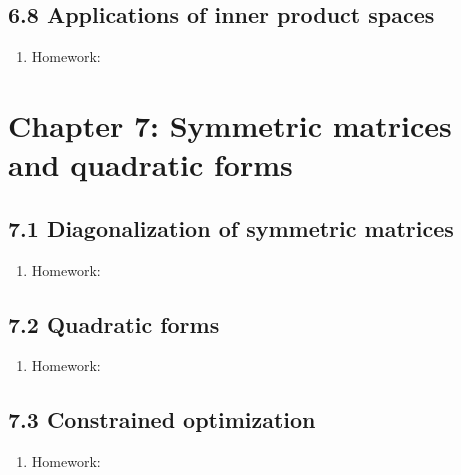 \documentclass{article}
\begin{document}
\subsection{6.8 Applications of inner product spaces}

\begin{enumerate}

\item Homework: 

\end{enumerate}

\section{Chapter 7: Symmetric matrices and quadratic forms} 

\subsection{7.1 Diagonalization of symmetric matrices}

\begin{enumerate}

\item Homework: 

\end{enumerate}

\subsection{7.2 Quadratic forms}

\begin{enumerate}

\item Homework: 

\end{enumerate}

\subsection{7.3 Constrained optimization}

\begin{enumerate}

\item Homework: 

\end{enumerate}
\end{document}
